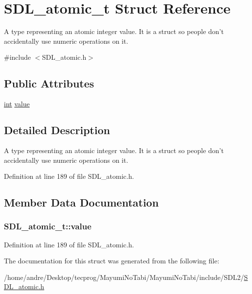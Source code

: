 \hypertarget{struct_s_d_l__atomic__t}{\section{S\-D\-L\-\_\-atomic\-\_\-t Struct Reference}
\label{struct_s_d_l__atomic__t}
}


A type representing an atomic integer value. It is a struct so people don't accidentally use numeric operations on it.  




{\ttfamily \#include $<$S\-D\-L\-\_\-atomic.\-h$>$}

\subsection*{Public Attributes}
\begin{DoxyCompactItemize}
\item 
\hyperlink{_s_d_l__thread_8h_a6a64f9be4433e4de6e2f2f548cf3c08e}{int} \hyperlink{struct_s_d_l__atomic__t_a0d09ddf3cc5798c709edb7cea104203a}{value}
\end{DoxyCompactItemize}


\subsection{Detailed Description}
A type representing an atomic integer value. It is a struct so people don't accidentally use numeric operations on it. 

Definition at line 189 of file S\-D\-L\-\_\-atomic.\-h.



\subsection{Member Data Documentation}
\hypertarget{struct_s_d_l__atomic__t_a0d09ddf3cc5798c709edb7cea104203a}{
\subsubsection[{value}]{ S\-D\-L\-\_\-atomic\-\_\-t\-::value}}\label{struct_s_d_l__atomic__t_a0d09ddf3cc5798c709edb7cea104203a}


Definition at line 189 of file S\-D\-L\-\_\-atomic.\-h.



The documentation for this struct was generated from the following file\-:\begin{DoxyCompactItemize}
\item 
/home/andre/\-Desktop/tecprog/\-Mayumi\-No\-Tabi/\-Mayumi\-No\-Tabi/include/\-S\-D\-L2/\hyperlink{_s_d_l__atomic_8h}{S\-D\-L\-\_\-atomic.\-h}\end{DoxyCompactItemize}
